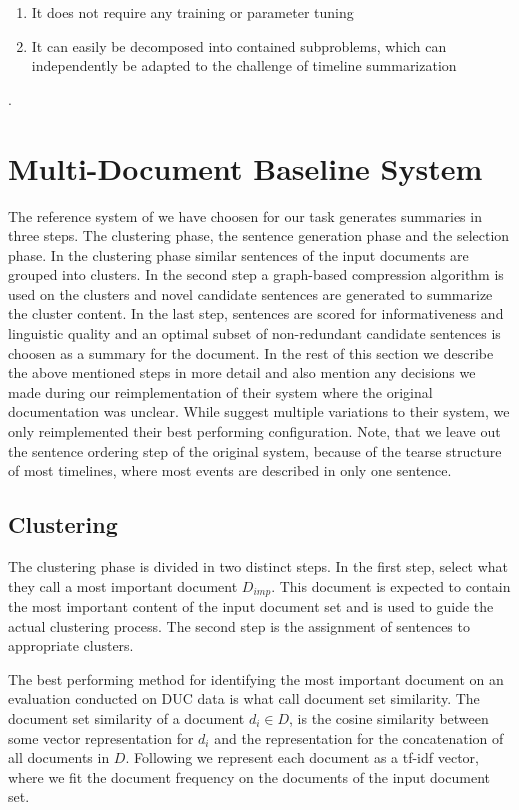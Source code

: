 \documentclass[a4paper,BCOR=10mm]{report}
\begin{document}
\begin{enumerate}
\item{It does not require any training or parameter tuning}
\item{It can easily be decomposed into contained subproblems, which can independently be adapted to the challenge of timeline summarization}
\end{enumerate}.


\section{Multi-Document Baseline System} \label{sec:mds-baseline}

The reference system of \citet{banerjee} we have choosen for our task generates summaries in three steps. The clustering phase, the sentence generation phase and the selection phase. In the clustering phase similar sentences of the input documents are grouped into clusters. In the second step a graph-based compression algorithm is used on the clusters and novel candidate sentences are generated to summarize the cluster content. In the last step, sentences are scored for informativeness and linguistic quality and an optimal subset of non-redundant candidate sentences is choosen as a summary for the document. In the rest of this section we describe the above mentioned steps in more detail and also mention any decisions we made during our reimplementation of their system where the original documentation was unclear.
While \citeauthor{banerjee} suggest multiple variations to their system, we only reimplemented their best performing configuration. Note, that we leave out the sentence ordering step of the original system, because of the tearse structure of most timelines, where most events are described in only one sentence.

\subsection{Clustering}  \label{sec:baseline-clustering}

The clustering phase is divided in two distinct steps. In the first step, \citeauthor{banerjee} select what they call a most important document $D_{imp}$. This document is expected to contain the most important content of the input document set and is used to guide the actual clustering process. The second step is the assignment of sentences to appropriate clusters.

The best performing method for identifying the most important document on an evaluation conducted on DUC data is what \citeauthor{banerjee} call document set similarity.
The document set similarity of a document $d_i \in D$, is the cosine similarity between some vector representation for $d_i$ and the representation for the concatenation of all documents in $D$.
Following \citeauthor{banerjee} we represent each document as a tf-idf vector, where we fit the document frequency on the documents of the input document set.
\end{document}
